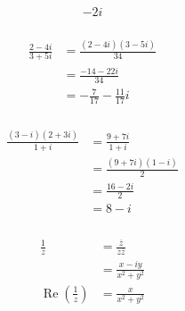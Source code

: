 \documentclass{article}
\renewcommand{\Re}{\operatorname{Re}}
\begin{document}
\subsubsection{}

\[-2 i\]

\setcounter{subsubsection}{14}
\subsubsection{}

\begin{align*}
  \frac{2 - 4 i}{3 + 5 i} & = \frac{(2 - 4 i) (3 - 5 i)}{34}  \\
                          & = \frac{-14 - 22 i}{34}           \\
                          & = -\frac{7}{17} - \frac{11}{17} i
\end{align*}

\setcounter{subsubsection}{16}
\subsubsection{}

\begin{align*}
  \frac{(3 - i) (2 + 3 i)}{1 + i} & = \frac{9 + 7 i}{1 + i}       \\
                                  & = \frac{(9 + 7 i) (1 - i)}{2} \\
                                  & = \frac{16 - 2 i}{2}          \\
                                  & = 8 - i
\end{align*}

\setcounter{subsubsection}{26}
\subsubsection{}

\begin{align*}
  \frac{1}{z}                    & = \frac{\overline{z}}{z \overline{z}} \\
                                 & = \frac{x - i y}{x^2 + y^2}           \\
  \Re \left( \frac{1}{z} \right) & = \frac{x}{x^2 + y^2}
\end{align*}

\setcounter{subsubsection}{28}
\subsubsection{}
\end{document}

